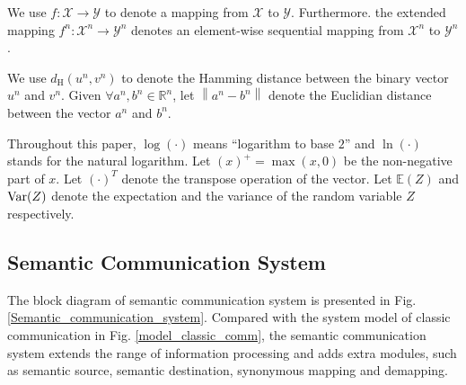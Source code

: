 \documentclass[12pt, draftclsnofoot,onecolumn]{IEEEtran}
\begin{document}
We use $f:\mathcal{X}\to\mathcal{Y}$ to denote a mapping from $\mathcal{X}$ to $\mathcal{Y}$. Furthermore. the extended mapping $f^n:\mathcal{X}^n\to\mathcal{Y}^n$ denotes an element-wise sequential mapping from $\mathcal{X}^n$ to $\mathcal{Y}^n$.

We use $d_{\text{H}}(u^n,v^n)$ to denote the Hamming distance between the binary vector $u^n$ and $v^n$. Given $\forall {a^n}, {b^n}\in \mathbb{R}^n$, let $\left\|a^n-b^n\right\|$ denote the Euclidian distance between the vector $a^n$ and $b^n$.

Throughout this paper, $\log\left(\cdot\right)$ means ``logarithm to base $2$'' and $\ln\left(\cdot\right)$ stands for the natural logarithm. Let $(x)^{+}=\max(x,0)$ be the non-negative part of $x$. Let $(\cdot)^T$ denote the transpose operation of the vector. Let $\mathbb{E}(Z)$ and ${\rm{Var}}(Z)$ denote the expectation and the variance of the random variable $Z$ respectively.

\subsection{Semantic Communication System}
The block diagram of semantic communication system is presented in Fig. \ref{Semantic_communication_system}. Compared with the system model of classic communication in Fig. \ref{model_classic_comm}, the semantic communication system extends the range of information processing and adds extra modules, such as semantic source, semantic destination, synonymous mapping and demapping.
\end{document}
